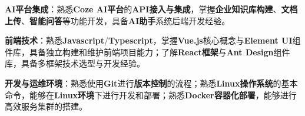 \item \textbf{AI平台集成}：熟悉\textbf{Coze AI平台}的\textbf{API接入与集成}，掌握\textbf{企业知识库构建}、\textbf{文档上传}、\textbf{智能问答}等功能开发，具备\textbf{AI助手}系统后端开发经验。
\item \textbf{前端技术}：熟悉\textbf{Javascript}/\textbf{Typescript}，掌握\textbf{Vue.js}核心概念与\textbf{Element UI}组件库，具备独立构建和维护前端项目能力；了解\textbf{React框架}与\textbf{Ant Design}组件库，具备多框架技术选型与开发经验。
\item \textbf{开发与运维环境}：熟悉使用\textbf{Git}进行\textbf{版本控制}的流程；熟悉\textbf{Linux操作系统}的基本命令，能够在\textbf{Linux环境}下进行开发和部署；熟悉\textbf{Docker容器化部署}，能够进行高效服务集群的搭建。